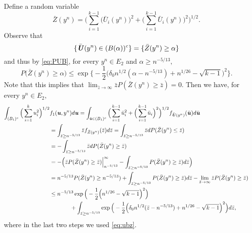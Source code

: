 \documentclass[11pt,onecolumn]{IEEEtran}
\def\mathbi#1{{\textbf{\textit #1}}}
\begin{document}
Define a random variable
$$
\bar{Z}(y^n)= \Big(\sum_{i=1}^{k-1} \big(\bar{U}_i(y^n) \big)^2
+ \big( \sum_{i=1}^{k-1}\bar{U}_i(y^n) \big)^2\Big)^{1/2}.
$$
Observe that 
  $$
  \{\bar{\mathbi{U}}(y^n) \in (B(\alpha))^c\}=\{\bar{Z}(y^n) \ge \alpha\}$$
  and thus by \eqref{eq:PUB}, for every $y^n \in E_2$ and $ \alpha \ge n^{-5/13},$
  \begin{equation}\label{eq:ubz}
P  \Big(\bar{Z}(y^n) \ge \alpha \Big) \le
\exp\Big\{-\frac{1}{2} \Big( \delta_0 n^{1/2} (\alpha - n^{-5/13} ) + n^{1/26}-\sqrt{k-1} \Big)^2 \Big\} .
\end{equation}
Note that this implies that $\lim_{\bar{z}\to\infty} \bar{z} P(\bar{Z}(y^n) \ge \bar{z})=0.$
Then we have, for every $y^n \in E_2,$
\begin{align}
\int_{ (B_1)^c} \Big(\sum_{i=1}^k u_i^2 \Big)^{1/2} &f_1(\mathbi{u},y^n) d\mathbi{u}  =  
{\int_{\bar{\mathbi{u}} \in (B_1)^c} 
\Big(\sum_{i=1}^{k-1}\bar{u}_i^2
+\Big(\sum_{i=1}^{k-1}\bar{u}_i\Big)^2\Big)^{1/2}
f_{\bar{\mathbi{U}}(y^n)}( \bar{\mathbi{u}} ) d\bar{\mathbi{u}} }\nonumber \\
& = \int_{\bar{z} \ge n^{-5/13}} 
\bar{z}
f_{\bar{Z}(y^n) }( \bar{z} ) d\bar{z}
= \int_{\bar{z} \ge n^{-5/13}} 
\bar{z} dP(\bar{Z}(y^n) \le \bar{z}) \nonumber \\
& = - \int_{\bar{z} \ge n^{-5/13}} 
\bar{z} dP(\bar{Z}(y^n) \ge \bar{z}) \nonumber \\
& = - \Big(  \bar{z} P(\bar{Z}(y^n) \ge \bar{z}) \Big|_{n^{-5/13}}^{\infty} -  \int_{\bar{z} \ge n^{-5/13}} 
 P(\bar{Z}(y^n) \ge \bar{z}) d \bar{z}  \Big) \nonumber \\
& = n^{-5/13} P(\bar{Z}(y^n) \ge n^{-5/13}) + \int_{\bar{z} \ge n^{-5/13}} 
 P(\bar{Z}(y^n) \ge \bar{z}) d \bar{z}
- \lim_{\bar{z}\to\infty} \bar{z} P(\bar{Z}(y^n) \ge \bar{z}) \nonumber \\
&\le  n^{-5/13} \exp\Big(-\frac{1}{2} \Big(  n^{1/26}-\sqrt{k-1} \Big)^2 \Big)\nonumber \\
&\hspace*{.5in}+ \int_{\bar{z} \ge n^{-5/13}}  \exp\Big(-\frac{1}{2} \Big( \delta_0 n^{1/2} (\bar{z} - n^{-5/13} ) + n^{1/26}-\sqrt{k-1} \Big)^2 \Big) d \bar{z}, \label{eq:cmp}
\end{align}
where in the last two steps we used \eqref{eq:ubz}. 
\end{document}
